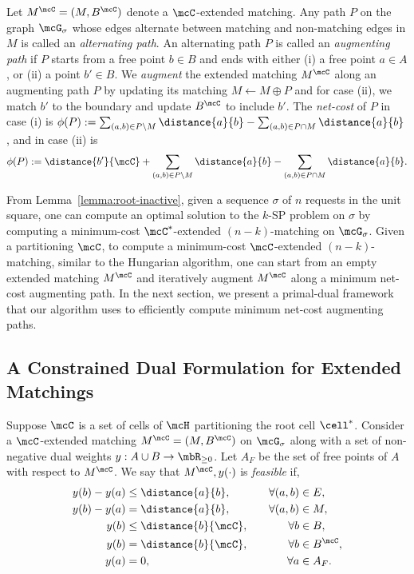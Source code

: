 Let $M^\mcC=(M, B^\mcC)$ denote a $\mcC$-extended matching.
Any path $P$ on the graph $\mcG_\sigma$ whose edges alternate between matching and non-matching edges in $M$ is called an \emph{alternating path}. 
An alternating path $P$ is called an \emph{augmenting path} if $P$ starts from a free point $b\in B$ and ends with either (i) a free point $a\in A$, or (ii) a point $b'\in B$.  We \emph{augment} the extended matching $M^{\mcC}$ along an augmenting path $P$ by updating its matching $M\leftarrow M\oplus P$ and for case (ii), we match $b'$ to the boundary and update $B^\mcC$ to include $b'$. The \emph{net-cost} of $P$ in case (i) is $\phi(P):=\sum_{(a,b)\in P\setminus M}\distance{a}{b} - \sum_{(a,b)\in P\cap M}\distance{a}{b}$, and 
in case (ii) is \[\phi(P):=\distance{b'}{\mcC} + \sum_{(a,b)\in P\setminus M}\distance{a}{b} - \sum_{(a,b)\in P\cap M}\distance{a}{b}.\] 


From Lemma~\ref{lemma:root-inactive}, given a sequence $\sigma$ of $n$ requests in the unit square, one can compute an optimal solution to the $k$-SP problem on $\sigma$ by computing a minimum-cost $\mcC^*$-extended $(n-k)$-matching on $\mcG_\sigma$. Given a partitioning $\mcC$, to compute a minimum-cost $\mcC$-extended $(n-k)$-matching, similar to the Hungarian algorithm, one can start from an empty extended matching $M^\mcC$ and iteratively augment $M^\mcC$ along a minimum net-cost augmenting path. In the next section, we present a primal-dual framework that our algorithm uses to efficiently compute minimum net-cost augmenting paths.




\subsection{A Constrained Dual Formulation for Extended Matchings}\label{sec:dual}
Suppose $\mcC$ is a set of cells of $\mcH$ partitioning the root cell $\cell^*$. Consider a $\mcC$-extended matching $M^\mcC=(M, B^\mcC)$ on $\mcG_\sigma$ along with a set of non-negative dual weights $y:A\cup B\rightarrow \mbR_{\ge0}$. Let $A_F$ be the set of free points of $A$ with respect to $M^\mcC$. We say that $M^{\mcC}, y(\cdot)$ is \emph{feasible} if,
\begin{align}
    y(b) - y(a) &\le \distance{a}{b},&  \quad \forall(a,b)&\in E,\label{eq:dualfeasibility-non-matching-time}\\
    y(b) - y(a) &= \distance{a}{b},& \quad \forall(a,b)&\in M,\label{eq:dualfeasibility-matching-time}\\
%
%
%
    y(b) &\le \distance{b}{\mcC},&  \quad \forall b&\in B,\label{eq:dualfeasibility-b}\\
    y(b) &= \distance{b}{\mcC},&  \quad \forall b&\in B^\mcC,\label{eq:dualfeasibility-b-admissible}\\
    y(a) &= 0,& \quad \forall a&\in A_F.\label{eq:dualfeasibility-a-free}
\end{align}

